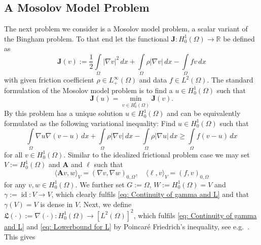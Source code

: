 \documentclass[12pt,twoside,reqno]{amsart}
\theoremstyle{definition}
\numberwithin{equation}{section}
\renewcommand{\L}{\mathfrak{L}}
\newcommand{\A} {\bm{A}}
\newcommand{\lin} {\bm{\ell}}
\newcommand  {\R}  {\mathbb R}
\begin{document}


    \subsection{A Mosolov Model Problem} \label{sec:Mosolov}

        The next problem we consider is a Mosolov model problem, a scalar variant of the Bingham problem. To that end let the functional $\bm{J}:H^1_0(\Omega)\to\R$ be 
         defined as
        \begin{equation}\label{eq:Mosolov:Energyfunctional}
            \bm{J}(v):= \frac12\int\limits_\Omega|\nabla v|^2\,dx+\int\limits_\Omega \rho|\nabla v|\,dx-\int\limits_\Omega fv\,dx
        \end{equation}
        with given friction coefficient $\rho\in L_+^\infty(\Omega)$ and data $f\in L^2(\Omega)$. The standard formulation of the Mosolov model problem is to find a $u\in H^1_0(\Omega)$ such that
        \begin{equation} \label{eq:Mosolov:Mini}
            \bm{J}(u)=\min\limits_{v\in H_0^1(\Omega)}\bm{J}(v).
        \end{equation}
        By \cite[Lem.~4.1]{Glowinski1984} this problem has a unique solution $u\in H^1_0(\Omega)$ and can be equivalently formulated as the following variational inequality: Find $u\in H^1_0(\Omega)$ such that
        \begin{equation}\label{eq: Bingham Variational Inequality}
            \int\limits_\Omega \nabla u \nabla(v-u)\,dx + \int\limits_\Omega \rho|\nabla v|\,dx-\int\limits_\Omega \rho|\nabla u|\,dx\geq \int\limits_\Omega f(v-u)\,dx
        \end{equation}
        for all $v\in H^1_0(\Omega)$.
        Similar to the idealized frictional problem case we may set $ V:= H^1_0(\Omega)$ and $\A$ and $\lin$ such that
        \begin{equation*}
                \langle \A v,w\rangle_V=(\nabla v,\nabla w)_{0,\Omega},\quad \langle \lin ,v\rangle_V=(f,v)_{0,\Omega}
        \end{equation*}
        for any $v,w\in H^1_0(\Omega)$. We further set $G:=\Omega$, $W:=H^1_0(\Omega)=V$ and $\gamma:=\operatorname{id}:V\to V$, which clearly fulfils \eqref{eq: Continuity of gamma and L} and that $\gamma(V)=V$ is dense in $V$. Next, we define $\L(\cdot):=\nabla(\cdot):H^1_0(\Omega)\to [L^2(\Omega)]^2$, which fulfils \eqref{eq: Continuity of gamma and L} and \eqref{eq: Lowerbound for L} by Poincar\'e Friedrich's inequality, see e.g.~\cite[Prop.~5.3.4]{Brenner2008}. This gives 
\end{document}
